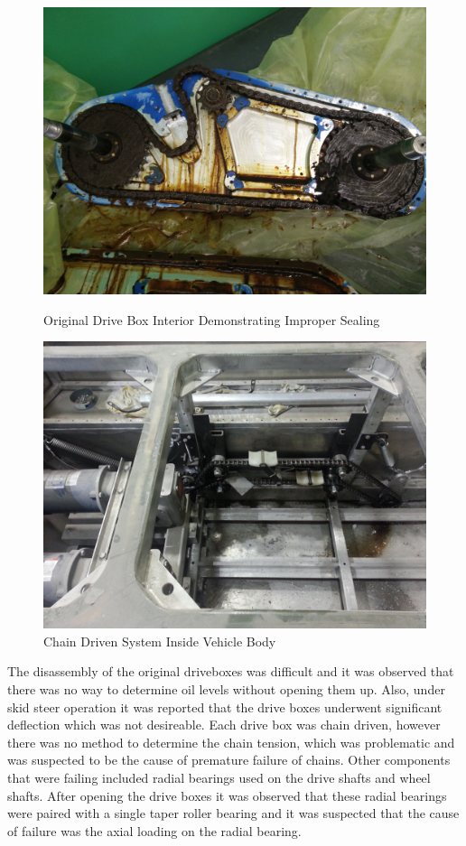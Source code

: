 \begin{figure}[h]
\centering
\begin{minipage}{0.45\linewidth}
\includegraphics[width=\linewidth]{./images/inside_drive_box_orig}
\caption{Original Drive Box Interior Demonstrating Improper Sealing}
\label{fig:inside_drive_box_orig}
\end{minipage}
\begin{minipage}{0.45\linewidth}
\includegraphics[width=\linewidth]{./images/interior_orig}
\caption{Chain Driven System Inside Vehicle Body}
\label{fig:interior_orig}
\end{minipage}
\end{figure}

The disassembly of the original driveboxes was difficult and it was observed that there was no way to determine oil levels without opening them up. Also, under skid steer operation it was reported that the drive boxes underwent significant deflection which was not desireable. Each drive box was chain driven, however there was no method to determine the chain tension, which was problematic and was suspected to be the cause of premature failure of chains. Other components that were failing included radial bearings used on the drive shafts and wheel shafts. After opening the drive boxes it was observed that these radial bearings were paired with a single taper roller bearing and it was suspected that the cause of failure was the axial loading on the radial bearing. 
